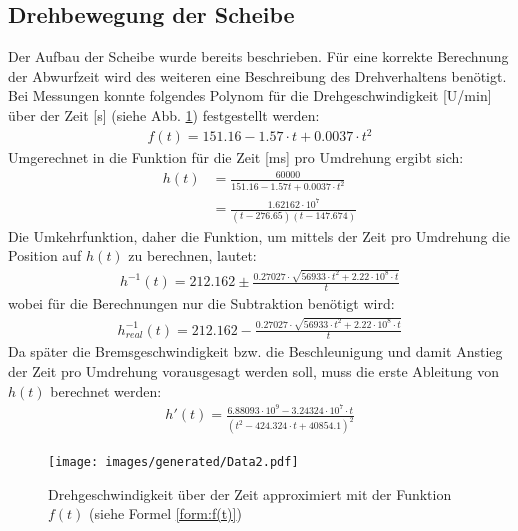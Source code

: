 \subsection{Drehbewegung der Scheibe}
\label{subs:dreh_approx}
Der Aufbau der Scheibe wurde bereits beschrieben.
Für eine korrekte Berechnung der Abwurfzeit wird des weiteren eine Beschreibung des Drehverhaltens benötigt.
Bei Messungen konnte folgendes Polynom für die Drehgeschwindigkeit [U/min] über der Zeit [s] (siehe Abb. \ref{img:drehgeschw}) festgestellt werden:
\begin{align}
	f(t) = 151.16 - 1.57 \cdot t + 0.0037 \cdot t^2 \label{form:f(t)}
\end{align}
Umgerechnet in die Funktion für die Zeit [ms] pro Umdrehung ergibt sich:
\begin{align}
	h(t) 	&= \frac{60000}{151.16 - 1.57t + 0.0037 \cdot t^2} \\
	    	&= \frac{1.62162\cdot 10^7}{(t-276.65) (t-147.674)} \label{form:h(t)}
\end{align}
Die Umkehrfunktion, daher die Funktion, um mittels der Zeit pro Umdrehung die Position auf $h(t)$ zu berechnen, lautet:
\begin{align}
	h^{-1}(t) 	= 212.162 \pm \frac{0.27027 \cdot \sqrt{56933\cdot t^2 + 2.22\cdot 10^8 \cdot t}}{t} \label{form:h-1(t)}
\end{align}
wobei für die Berechnungen nur die Subtraktion benötigt wird:
\begin{align}
	h^{-1}_{real}(t) 	= 212.162 - \frac{0.27027 \cdot \sqrt{56933\cdot t^2 + 2.22\cdot 10^8 \cdot t}}{t} \label{form:h-1(t)_2}
\end{align}
Da später die Bremsgeschwindigkeit bzw. die Beschleunigung und damit Anstieg der Zeit pro Umdrehung vorausgesagt werden soll, muss die erste Ableitung von $h(t)$ berechnet werden:
\begin{align}
	h'(t) 	= \frac{6.88093\cdot 10^9 - 3.24324 \cdot 10^7 \cdot t}{(t^2 - 424.324\cdot t + 40854.1)^2} \label{form:h'(t)}
\end{align}

\begin{figure}[hb] \centering
	\texttt{[image: images/generated/Data2.pdf]}
	\caption{Drehgeschwindigkeit über der Zeit approximiert mit der Funktion $f(t)$ (siehe Formel \ref{form:f(t)})}
	\label{img:drehgeschw}
\end{figure}

